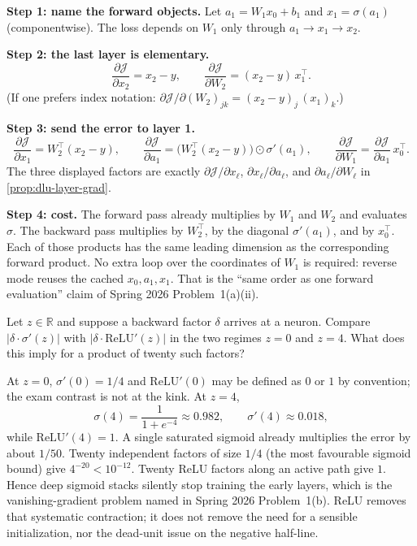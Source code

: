 \begin{solution}
\textbf{Step 1: name the forward objects.}
Let \(a_1=W_1 x_0+b_1\) and \(x_1=\sigma(a_1)\) (componentwise). The loss depends on \(W_1\) only through \(a_1\to x_1\to x_2\).

\textbf{Step 2: the last layer is elementary.}
\[
\frac{\partial\mathcal{J}}{\partial x_2}=x_2-y,
\qquad
\frac{\partial\mathcal{J}}{\partial W_2}
=
(x_2-y)\,x_1^\top.
\]
(If one prefers index notation: \(\partial\mathcal{J}/\partial (W_2)_{jk}=(x_2-y)_j\,(x_1)_k\).)

\textbf{Step 3: send the error to layer 1.}
\[
\frac{\partial\mathcal{J}}{\partial x_1}
=
W_2^\top(x_2-y),
\qquad
\frac{\partial\mathcal{J}}{\partial a_1}
=
\bigl(W_2^\top(x_2-y)\bigr)\odot\sigma'(a_1),
\qquad
\frac{\partial\mathcal{J}}{\partial W_1}
=
\frac{\partial\mathcal{J}}{\partial a_1}\,x_0^\top.
\]
The three displayed factors are exactly \(\partial\mathcal{J}/\partial x_\ell\), \(\partial x_\ell/\partial a_\ell\), and \(\partial a_\ell/\partial W_\ell\) in \cref{prop:dlu-layer-grad}.

\textbf{Step 4: cost.}
The forward pass already multiplies by \(W_1\) and \(W_2\) and evaluates \(\sigma\). The backward pass multiplies by \(W_2^\top\), by the diagonal \(\sigma'(a_1)\), and by \(x_0^\top\). Each of those products has the same leading dimension as the corresponding forward product. No extra loop over the coordinates of \(W_1\) is required: reverse mode reuses the cached \(x_0,a_1,x_1\). That is the ``same order as one forward evaluation'' claim of Spring 2026 Problem~1(a)(ii).
\end{solution}

\begin{exercise}
\label{ex:dlu-relu}
Let \(z\in\mathbb{R}\) and suppose a backward factor \(\delta\) arrives at a neuron. Compare \(\lvert\delta\cdot\sigma'(z)\rvert\) with \(\lvert\delta\cdot\mathrm{ReLU}'(z)\rvert\) in the two regimes \(z=0\) and \(z=4\). What does this imply for a product of twenty such factors?
\end{exercise}

\begin{solution}
At \(z=0\), \(\sigma'(0)=1/4\) and \(\mathrm{ReLU}'(0)\) may be defined as \(0\) or \(1\) by convention; the exam contrast is not at the kink. At \(z=4\),
\[
\sigma(4)=\frac{1}{1+e^{-4}}\approx 0.982,
\qquad
\sigma'(4)\approx 0.018,
\]
while \(\mathrm{ReLU}'(4)=1\). A single saturated sigmoid already multiplies the error by about \(1/50\). Twenty independent factors of size \(1/4\) (the most favourable sigmoid bound) give \(4^{-20}<10^{-12}\). Twenty ReLU factors along an active path give \(1\). Hence deep sigmoid stacks silently stop training the early layers, which is the vanishing-gradient problem named in Spring 2026 Problem~1(b). ReLU removes that systematic contraction; it does not remove the need for a sensible initialization, nor the dead-unit issue on the negative half-line.
\end{solution}

